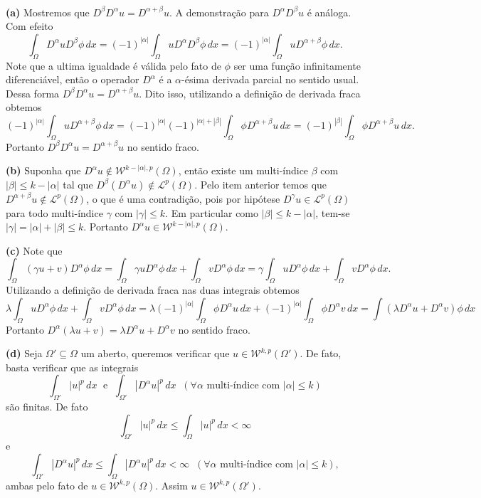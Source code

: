 \documentclass[a4paper, 11pt]{book}
\theoremstyle{definition}
\newcommand{\cL}{\mathcal{L}}
\newcommand{\cW}{\mathcal{W}}
\begin{document}
\begin{prf}
    ~

    \textbf{(a)} Mostremos que $D^{\beta}D^{\alpha} u = D^{\alpha + \beta}u$.
    A demonstração para $D^{\alpha}D^{\beta} u$ é análoga.
    Com efeito
    \[
        \int_\Omega D^{\alpha} u D^{\beta} \phi \, dx = (-1)^{|\alpha|} \int_\Omega u D^{\alpha} D^{\beta} \phi \, dx = (-1)^{|\alpha|} \int_\Omega u D^{\alpha + \beta} \phi \,dx.
    \]
    Note que a ultima igualdade é válida pelo fato de $\phi$ ser uma função infinitamente diferenciável, então o operador $D^\alpha$ é a $\alpha$-ésima derivada parcial no sentido usual.
    Dessa forma $D^{\beta}D^{\alpha} u = D^{\alpha + \beta} u$.
    Dito isso, utilizando a definição de derivada fraca obtemos
    \[
        (-1)^{|\alpha|} \int_\Omega u D^{\alpha + \beta} \phi \,dx = (-1)^{|\alpha|}(-1)^{|\alpha| + |\beta|} \int_\Omega \phi D^{\alpha+\beta} u \,dx = (-1)^{|\beta|} \int_\Omega \phi D^{\alpha + \beta} u \,dx.
    \]
    Portanto $D^{\beta} D^{\alpha} u = D^{\alpha + \beta} u$ no sentido fraco.

    \textbf{(b)} Suponha que $D^\alpha u \not\in \cW^{k-|\alpha|,p}(\Omega)$, então existe um multi-índice $\beta$ com $|\beta| \leqslant k - |\alpha|$ tal que $D^{\beta}(D^{\alpha}u) \not\in \cL^p(\Omega)$.
    Pelo item anterior temos que $D^{\alpha+\beta}u \not\in \cL^p(\Omega)$, o que é uma contradição, pois por hipótese $D^{\gamma}u \in \cL^p(\Omega)$ para todo multi-índice $\gamma$ com $|\gamma| \leqslant k$. Em particular como $|\beta| \leqslant k - |\alpha|$, tem-se $|\gamma| = |\alpha| + |\beta| \leqslant k$.
    Portanto $D^{\alpha}u \in \cW^{k-|\alpha|,p}(\Omega)$.

    \textbf{(c)} Note que
    \[
        \int_\Omega (\gamma u + v) D^{\alpha}\phi \,dx = \int_\Omega \gamma u D^\alpha \phi \, dx + \int_\Omega v D^\alpha \phi \, dx = \gamma \int_\Omega u D^{\alpha} \phi \,dx + \int_\Omega v D^{\alpha} \phi \, dx.
    \]
    Utilizando a definição de derivada fraca nas duas integrais obtemos
    {\small
    \[
        \lambda \int_\Omega u D^{\alpha} \phi \,dx + \int_\Omega v D^{\alpha} \phi \, dx = \lambda (-1)^{|\alpha|} \int_\Omega \phi D^{\alpha} u \, dx + (-1)^{|\alpha|}\int_\Omega \phi D^{\alpha} v \, dx = \int (\lambda D^{\alpha}u + D^{\alpha}v )\phi \,dx
    \]}\!
    Portanto $D^{\alpha}(\lambda u + v) = \lambda D^\alpha u + D^\alpha v$ no sentido fraco.

    \textbf{(d)} Seja $\Omega' \subseteq \Omega$ um aberto, queremos verificar que $u \in \cW^{k,p}(\Omega')$.
    De fato, basta verificar que as integrais
    \[
        \int_{\Omega'} |u|^p \, dx \;\text{ e }\; \int_{\Omega'} |D^{\alpha}u|^p \, dx \;\; (\forall \alpha \text{ multi-índice com }|\alpha| \leqslant k)
    \]
    são finitas. De fato
    \[
        \int_{\Omega'} |u|^p \, dx \leqslant \int_{\Omega} |u|^p \,dx < \infty
    \]
    e
    \[
        \int_{\Omega'} |D^\alpha u|^p \, dx \leqslant \int_{\Omega} |D^\alpha u|^p \,dx < \infty \;\; (\forall \alpha \text{ multi-índice com }|\alpha| \leqslant k),
    \]
    ambas pelo fato de $u \in \cW^{k,p}(\Omega)$.
    Assim $u \in \cW^{k,p}(\Omega')$.


\end{prf}
\end{document}
